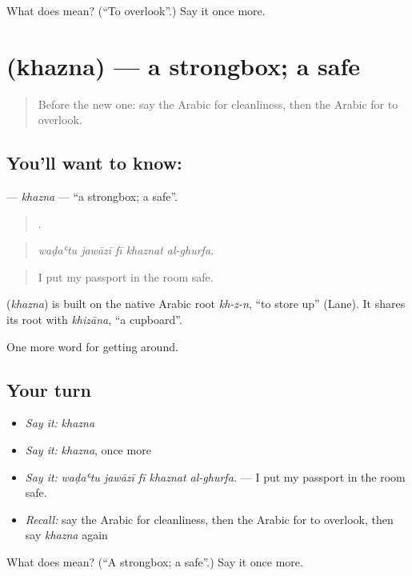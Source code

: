 \begin{tcolorbox}[breakable,colback=teal!4,colframe=teal!35!black,title={Before you move on}]
What does  mean? (\textquotedblleft{}To overlook\textquotedblright{}.) Say it once more.
\end{tcolorbox}
\section[\texorpdfstring{\ar{خزنة} (khazna)}{خزنة (khazna)}]{ (khazna) — a strongbox; a safe}

\label{lesson:AR-C443-khazna}



\begin{quote}
Before the new one: say the Arabic for cleanliness, then the Arabic for to overlook.
\end{quote}

\subsection*{You'll want to know: }
\textbf{} — \emph{khazna} — \textquotedblleft{}a strongbox; a safe\textquotedblright{}.

\begin{quote}
    .
\end{quote}

\begin{quote}
\emph{waḍaʿtu jawāzī fī khaznat al-ghurfa.}
\end{quote}

\begin{quote}
I put my passport in the room safe.
\end{quote}

\begin{cousinweb}
\textbf{} (\emph{khazna}) is built on the native Arabic root \emph{kh-z-n}, \textquotedblleft{}to store up\textquotedblright{} (Lane). It shares its root with \emph{khizāna}, \textquotedblleft{}a cupboard\textquotedblright{}.
\end{cousinweb}

\begin{grammarlens}[title={What you've built}]
One more word for getting around.
\end{grammarlens}

\subsection*{Your turn}
\begin{itemize}
\raggedright
  \item \emph{Say it:} \emph{khazna}
  \item \emph{Say it:} \emph{khazna}, once more
  \item \emph{Say it:} \emph{waḍaʿtu jawāzī fī khaznat al-ghurfa.} — I put my passport in the room safe.
  \item \emph{Recall:} say the Arabic for cleanliness, then the Arabic for to overlook, then say \emph{khazna} again
\end{itemize}

\begin{tcolorbox}[breakable,colback=teal!4,colframe=teal!35!black,title={Before you move on}]
What does  mean? (\textquotedblleft{}A strongbox; a safe\textquotedblright{}.) Say it once more.
\end{tcolorbox}
